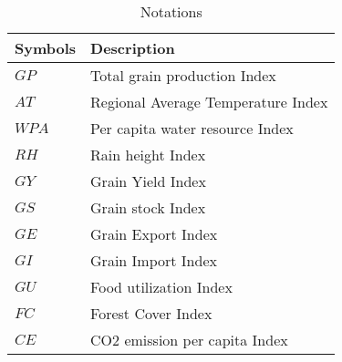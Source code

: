\documentclass{article}
\begin{document}
\begin{table}[htbp!]
    \centering
    \begin{tabular}{l|l}
        \hline
        Symbols & Description                        \\
        \hline
        $GP$    & Total grain production Index       \\

        $AT$    & Regional Average Temperature Index \\

        $WPA$   & Per capita water resource Index    \\

        $RH$    & Rain height Index                  \\

        $GY$    & Grain Yield Index                  \\

        $GS$    & Grain stock Index                  \\

        $GE$    & Grain Export Index                 \\

        $GI$    & Grain Import Index                 \\

        $GU$    & Food utilization Index             \\

        $FC$    & Forest Cover Index                 \\

        $CE$    & CO2 emission per capita Index      \\

        \hline
    \end{tabular}
    \caption{Notations}\label{nt}
\end{table}
\end{document}
